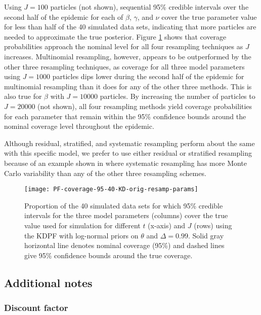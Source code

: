 \documentclass{elsarticle}
\begin{document}
Using $J = 100$ particles (not shown), sequential 95\% credible intervals over the second half of the epidemic for each of $\beta$, $\gamma$, and $\nu$ cover the true parameter value for less than half of the 40 simulated data sets, indicating that more particles are needed to approximate the true posterior. Figure \ref{fig:resamp} shows that coverage probabilities approach the nominal level for all four resampling techniques as $J$ increases. Multinomial resampling, however, appears to be outperformed by the other three resampling techniques, as coverage for all three model parameters using $J = 1000$ particles dips lower during the second half of the epidemic for multinomial resampling than it does for any of the other three methods. This is also true for $\beta$ with $J = 10000$ particles. By increasing the number of particles to $J = 20000$ (not shown), all four resampling methods yield coverage probabilities for each parameter that remain within the 95\% confidence bounds around the nominal coverage level throughout the epidemic.

Although residual, stratified, and systematic resampling perform about the same with this specific model, we prefer to use either residual or stratified resampling because of an example shown in \cite{Douc:Capp:Moul:comp:2005} where systematic resampling has more Monte Carlo variability than any of the other three resampling schemes.

\begin{figure}
\centering
\texttt{[image: PF-coverage-95-40-KD-orig-resamp-params]}
\caption{Proportion of the 40 simulated data sets for which 95\% credible intervals for the three model parameters (columns) cover the true value used for simulation for different $t$ (x-axis) and $J$ (rows) using the KDPF with log-normal priors on $\theta$ and $\Delta = 0.99$. Solid gray horizontal line denotes nominal coverage (95\%) and dashed lines give 95\% confidence bounds around the true coverage.} \label{fig:resamp}
\end{figure}

\subsection{Additional notes \label{sec:issues}}

\subsubsection{Discount factor}
\end{document}
